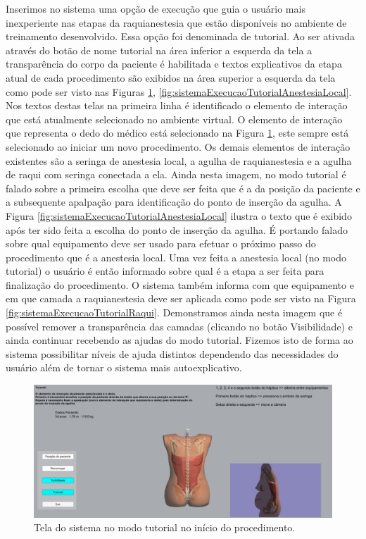 Inserimos no sistema uma opção de execução que guia o usuário mais inexperiente nas etapas da raquianestesia que estão disponíveis no ambiente de treinamento desenvolvido. Essa opção foi denominada de tutorial. Ao ser ativada através do botão de nome tutorial na área inferior a esquerda da tela a transparência do corpo da paciente é habilitada e textos explicativos da etapa atual de cada procedimento são exibidos na área superior a esquerda da tela como pode ser visto nas Figuras \ref{fig:sistemaExecucaoTutorialApalpacao}, \ref{fig:sistemaExecucaoTutorialAnestesiaLocal}. Nos textos destas telas na primeira linha é identificado o elemento de interação que está atualmente selecionado no ambiente virtual. O elemento de interação que representa o dedo do médico está selecionado na Figura \ref{fig:sistemaExecucaoTutorialApalpacao}, este sempre está selecionado ao iniciar um novo procedimento. Os demais elementos de interação existentes são a seringa de anestesia local, a agulha de raquianestesia e a agulha de raqui com seringa conectada a ela. Ainda nesta imagem, no modo tutorial é falado sobre a primeira escolha que deve ser feita que é a da posição da paciente e a subsequente apalpação para identificação do ponto de inserção da agulha. 
A Figura \ref{fig:sistemaExecucaoTutorialAnestesiaLocal} ilustra o texto que é exibido após ter sido feita a escolha do ponto de inserção da agulha. É portando falado sobre qual equipamento deve ser usado para efetuar o próximo passo do procedimento que é a anestesia local. Uma vez feita a anestesia local (no modo tutorial) o usuário é então informado sobre qual é a etapa a ser feita para finalização do procedimento. O sistema também informa com que equipamento e em que camada a raquianestesia deve ser aplicada como pode ser visto na Figura \ref{fig:sistemaExecucaoTutorialRaqui}. Demonstramos ainda nesta imagem que é possível remover a transparência das camadas (clicando no botão Visibilidade) e ainda continuar recebendo as ajudas do modo tutorial. Fizemos isto de forma ao sistema possibilitar níveis de ajuda distintos dependendo das necessidades do usuário além de tornar o sistema mais autoexplicativo. 

\begin{figure}[ht!]
    \centering
    \includegraphics[width=\textwidth]{capitulos/figuras/sistemaExecucaoTutorialApalpacao.png} 
    \caption{Tela do sistema no modo tutorial no início do procedimento.}
    \label{fig:sistemaExecucaoTutorialApalpacao}
\end{figure}


